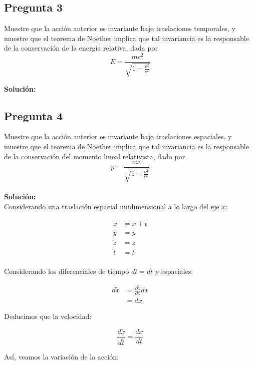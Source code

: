 \documentclass[../main_ej.tex]{subfiles}
\begin{document}
\subsection{Pregunta 3}
Muestre que la acción anterior es invariante bajo traslaciones temporales, y muestre que el teorema de Noether implica que tal invariancia es la responsable de la conservación de la energía relativa, dada por
\begin{equation}
  E=\frac{mc^2}{\sqrt{1-\frac{v^2}{c^2}}}
\end{equation}  

\textbf{Solución:}
\\  

\subsection{Pregunta 4}
Muestre que la acción anterior es invariante bajo traslaciones espaciales, y muestre que el teorema de Noether implica que tal invariancia es la responsable de la conservación del momento lineal relativista, dado por
\begin{equation}
  p=\frac{mv}{\sqrt{1-\frac{v^2}{c^2}}}
\end{equation}
\\
\textbf{Solución:} 
\\

Considerando una traslación espacial unidimensional a lo largo del eje $x$: 

\begin{align}
    \tilde{x} &= x + \epsilon \\
    \tilde{y} &= y \\
    \tilde{z} &= z \\
    \tilde{t} &= t \\
\end{align}

Considerando los diferenciales de tiempo $dt =d\tilde{t}$ y espaciales:

\begin{align}
    d\tilde{x} &= \frac{\partial \tilde{x}}{\partial x}dx \\
    &= dx
\end{align}

Deducimos que la velocidad: 

\begin{equation}
    \frac{d\tilde{x}}{d\tilde{t}} = \frac{dx}{dt}
\end{equation}

Así, veamos la variación de la acción: 
\end{document}
